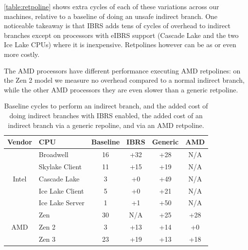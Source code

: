 \autoref{table:retpoline} shows extra cycles of each of these variations across our machines, relative to a baseline of doing an unsafe indirect branch.
One noticeable takeaway is that IBRS adds tens of cycles of overhead to indirect branches except on processors with eIBRS support (Cascade Lake and the two Ice Lake CPUs) where it is inexpensive.
Retpolines however can be as or even more costly.

The AMD processors have different performance executing AMD
retpolines: on the Zen 2 model we measure no overhead compared to a
normal indirect branch, while the other AMD processors they are even
slower than a generic retpoline.





\begin{table}[h]
\begin{center}
\begin{tabular}{ clcccc }
  \textbf{Vendor} & \textbf{CPU} & \textbf{Baseline} & \textbf{IBRS} & \textbf{Generic} & \textbf{AMD} \\ \hline
  \multirow{5}{*}{Intel} & Broadwell           & 16 & +32 & +28 & \tiny{N/A} \\
                         & Skylake Client      & 11 & +15 & +19 & \tiny{N/A} \\
                         & Cascade Lake        & 3 & +0 & +49 & \tiny{N/A} \\
                         & Ice Lake Client     & 5 & +0 & +21 & \tiny{N/A} \\
                         & Ice Lake Server     & 1 & +1 & +50 & \tiny{N/A} \\ \hline
  \multirow{3}{*}{AMD}   & Zen                 & 30 & \tiny{N/A} & +25 & +28 \\
                         & Zen 2               & 3 & +13 & +14 & +0 \\
                         & Zen 3               & 23 & +19 & +13 & +18 \\ \hline
\end{tabular}
\end{center}
\caption{Baseline cycles to perform an indirect branch, and the added cost of doing indirect branches with IBRS enabled, the added cost of an indirect branch via a generic repoline, and via an AMD retpoline.}
\label{table:retpoline}
\end{table}

